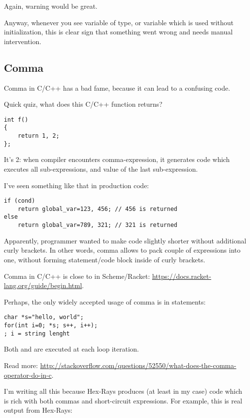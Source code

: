 Again, warning would be great.

Anyway, whenever you see variable of  type, or variable which is used without initialization, this is clear sign
that something went wrong and needs manual intervention.

\subsection{Comma}

Comma in C/C++ has a bad fame, because it can lead to a confusing code.

Quick quiz, what does this C/C++ function returns?

\begin{lstlisting}
int f()
{
	return 1, 2;
};
\end{lstlisting}

It's 2: when compiler encounters comma-expression, it generates code which executes all sub-expressions, and
 value of the last sub-expression.

I've seen something like that in production code:

\begin{lstlisting}
if (cond)
	return global_var=123, 456; // 456 is returned
else
	return global_var=789, 321; // 321 is returned
\end{lstlisting}

Apparently, programmer wanted to make code slightly shorter without additional curly brackets.
In other words, comma allows to pack couple of expressions into one, without forming
statement/code block inside of curly brackets.

Comma in C/C++ is close to  in Scheme/Racket: \url{https://docs.racket-lang.org/guide/begin.html}.

Perhaps, the only widely accepted usage of comma is in  statements:

\begin{lstlisting}
char *s="hello, world";
for(int i=0; *s; s++, i++);
; i = string lenght
\end{lstlisting}

Both  and  are executed at each loop iteration.

Read more: \url{http://stackoverflow.com/questions/52550/what-does-the-comma-operator-do-in-c}.

I'm writing all this because Hex-Rays produces (at least in my case) code which is rich with both commas and short-circuit
expressions.
For example, this is real output from Hex-Rays:

